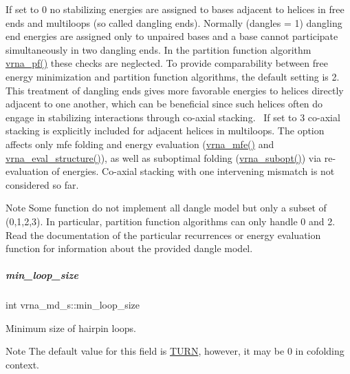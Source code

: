 If set to 0 no stabilizing energies are assigned to bases adjacent to helices in free ends and multiloops (so called dangling ends). Normally (dangles = 1) dangling end energies are assigned only to unpaired bases and a base cannot participate simultaneously in two dangling ends. In the partition function algorithm \hyperlink{group__part__func__global_ga29e256d688ad221b78d37f427e0e99bc}{vrna\+\_\+pf()} these checks are neglected. To provide comparability between free energy minimization and partition function algorithms, the default setting is 2. This treatment of dangling ends gives more favorable energies to helices directly adjacent to one another, which can be beneficial since such helices often do engage in stabilizing interactions through co-\/axial stacking.~\newline
If set to 3 co-\/axial stacking is explicitly included for adjacent helices in multiloops. The option affects only mfe folding and energy evaluation (\hyperlink{group__mfe__global_gabd3b147371ccf25c577f88bbbaf159fd}{vrna\+\_\+mfe()} and \hyperlink{group__eval_ga58f199f1438d794a265f3b27fc8ea631}{vrna\+\_\+eval\+\_\+structure()}), as well as suboptimal folding (\hyperlink{group__subopt__wuchty_ga0f11d738fb8c8b1885a90c11c8931ff6}{vrna\+\_\+subopt()}) via re-\/evaluation of energies. Co-\/axial stacking with one intervening mismatch is not considered so far. \begin{DoxyNote}{Note}
Some function do not implement all dangle model but only a subset of (0,1,2,3). In particular, partition function algorithms can only handle 0 and 2. Read the documentation of the particular recurrences or energy evaluation function for information about the provided dangle model. 
\end{DoxyNote}
\mbox{\label{group__model__details_a9ed7ba42fcc46915c5c0c524f3d255f5}} 
\subparagraph{\texorpdfstring{min\+\_\+loop\+\_\+size}{min\_loop\_size}}
{\footnotesize\ttfamily int vrna\+\_\+md\+\_\+s\+::min\+\_\+loop\+\_\+size}



Minimum size of hairpin loops. 

\begin{DoxyNote}{Note}
The default value for this field is \hyperlink{constants_8h_ae646250fd59311356c7e5722a81c3a96}{T\+U\+RN}, however, it may be 0 in cofolding context. 
\end{DoxyNote}


